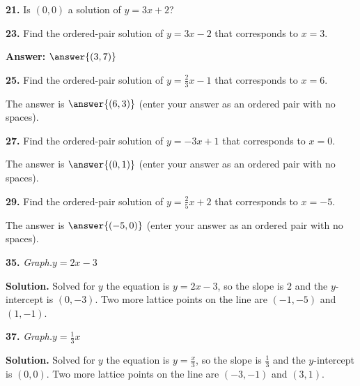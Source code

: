 \documentclass{ximera}
\begin{document}
\begin{problem}
\textbf{21.} Is $(0, 0)$ a solution of $y = 3x + 2$?

\begin{multipleChoice}
\end{multipleChoice}
\end{problem}

\begin{problem}
\textbf{23.} Find the ordered-pair solution of $y = 3x - 2$ that corresponds to $x = 3$.

\textbf{Answer:} $\answer{(3,7)}$
\end{problem}

\begin{problem}
\textbf{25.} Find the ordered-pair solution of $y = \frac{2}{3}x - 1$ that corresponds to
  $x = 6$.

The answer is $\answer{(6,3)}$ (enter your answer as an ordered pair with no spaces).
\end{problem}

\begin{problem}
\textbf{27.} Find the ordered-pair solution of $y = -3x + 1$ that corresponds to $x = 0$.

The answer is $\answer{(0,1)}$ (enter your answer as an ordered pair with no spaces).
\end{problem}

\begin{problem}
\textbf{29.} Find the ordered-pair solution of $y = \frac{2}{5}x + 2$ that corresponds to
  $x = -5$.

The answer is $\answer{(-5,0)}$ (enter your answer as an ordered pair with no spaces).
\end{problem}

\begin{problem}
\textbf{35.} \emph{Graph.}\quad $y = 2x - 3$        \figbox{\gridsm}

\begin{hint}
\textbf{Solution.} Solved for $y$ the equation is $y=2x - 3$, so the slope is $2$ and the $y$-intercept is $(0,-3)$. Two more lattice points on the line are $(-1,-5)$ and $(1,-1)$.
\end{hint}
\end{problem}

\begin{problem}
\textbf{37.} \emph{Graph.}\quad $y = \frac{1}{3}x$  \figbox{\gridsm}

\begin{hint}
\textbf{Solution.} Solved for $y$ the equation is $y=\frac{x}{3}$, so the slope is $\frac{1}{3}$ and the $y$-intercept is $(0,0)$. Two more lattice points on the line are $(-3,-1)$ and $(3,1)$.
\end{hint}
\end{problem}
\end{document}
